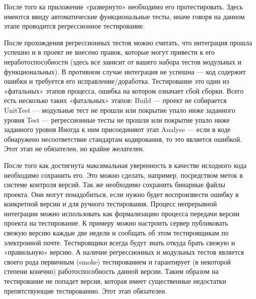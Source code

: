 \documentclass{../industrial-development}
\begin{document}
После того ка приложение «развернуто» необходимо его протестировать. Здесь имеются ввиду автоматические функциональные тесты, иначе говоря на данном этапе проводится регрессионное тестирование.

После прохождения регрессионных тестов можно считать, что интеграция прошла успешно и в проект не внесено правок, которые могут привести к его неработоспособности (здесь все зависит от вашего набора тестов модульных и функциональных). В противном случае интеграция не успешна — код содержит ошибки и требуется его исправление/доработка.
Тестирование это один из «фатальных» этапов процесса, ошибка на котором означает сбой сборки. Всего есть несколько таких «фатальных» этапов:	
	Build — проект не собирается
	UnitTest — модульные тест не прошли или покрытие упало ниже заданного уровня
	Test — регрессионные тесты не прошли или покрытие упало ниже заданного уровня
	Иногда к ним присоединяют этап Analyse — если в коде обнаружено несоответствие стандартам кодирования, то это является ошибкой.
Этот этап не обязателен, но крайне желателен.

После того как достигнута максимальная уверенность в качестве исходного кода необходимо сохранить его. Это можно сделать, например, посредством меток в системе контроля версий. Так же необходимо сохранить бинарные файлы проекта. Они могут понадобиться, если нужно будет воспроизвести ошибку в конкретной версии и для ручного тестирования.
Процесс непрерывной интеграции можно использовать как формализацию процесса передачи версии проекта на тестирование. К примеру можно настроить сервер публиковать свежую версию каждые две недели и сообщать об этом тестировщикам по электронной почте. Тестировщики всегда будут знать откуда брать свежую и «правильную» версию. А наличие регрессионных и модульных тестов является своего рода первичным (smoke) тестированием и гарантирует (в некоторой степени конечно) работоспособность данной версии. Таким образом на тестирование не попадет версия, которая имеет существенные недостатки препятствующие тестированию. Этот этап обязателен.
\end{document}
